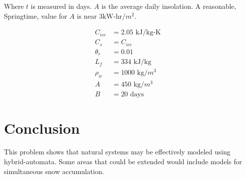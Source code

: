 \documentclass{article}
\begin{document}
Where $t$ is measured in days.
$A$ is the average daily insolation.
A reasonable, Springtime, value for $A$ is near $3 \text{kW-hr}/m^2$.

\begin{align}
 C_{ice} &= 2.05 \text{ kJ/kg-K} \\
 C_s &= C_{ice} \\
\theta_r &= 0.01 \\
L_f &= 334 \text{ kJ/kg} \\
\rho_w &= 1000 \text{ kg/$m^3$} \\
A &= 450 \text{ kg/$m^3$} \\
B &= 20 \text{ days}
\end{align}

 \section{Conclusion}
 
 This problem shows that natural systems may be effectively 
 modeled using hybrid-automata.
 Some areas that could be extended would include models
 for simultaneous snow accumulation.
 



\end{document}
